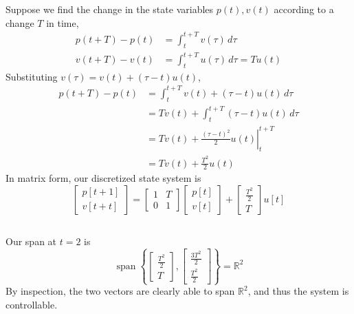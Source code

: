 \documentclass[]{article}
\newcommand{\Span}{\operatorname{span}}
\begin{document}
Suppose we find the change in the state variables \(p(t), v(t)\) according to a change \(T\) in time,
\begin{align}
	p(t + T) - p(t) &= \int_t^{t + T} v(\tau) \, d\tau \\
	v(t + T) - v(t) &= \int_t^{t + T} u(\tau) \, d\tau = T u(t)
\end{align}
Substituting \(v(\tau) = v(t) + (\tau - t) u(t)\),
\begin{align}
	p(t + T) - p(t) &= \int_t^{t + T} v(t) + (\tau - t) u(t) \, d\tau \\
	&= T v(t) + \int_t^{t + T} (\tau - t) u(t) \, d\tau \\
	&= \left.T v(t) + \frac{(\tau - t)^2}{2} u(t)\right|_t^{t + T} \\
	&= T v(t) + \frac{T^2}{2} u(t)
\end{align}
In matrix form, our discretized state system is
\begin{equation}
	\begin{bmatrix}
	p[t + 1] \\
	v[t + t]
	\end{bmatrix}
	=
	\begin{bmatrix}
	1 & T \\
	0 & 1
	\end{bmatrix}
	\begin{bmatrix}
	p[t] \\
	v[t]
	\end{bmatrix}
	+
	\begin{bmatrix}
	\frac{T^2}{2} \\
	T
	\end{bmatrix} u[t]
\end{equation}

\subsection{}

Our span at \(t = 2\) is
\begin{equation}
	\Span\left\{
	\begin{bmatrix}
	\frac{T^2}{2} \\
	T
	\end{bmatrix},
	\begin{bmatrix}
	\frac{3T^2}{2} \\
	\frac{T^2}{2}
	\end{bmatrix}
	\right\} = \mathbb{R}^2
\end{equation}
By inspection, the two vectors are clearly able to span \(\mathbb{R}^2\), and thus the system is controllable.
\end{document}
